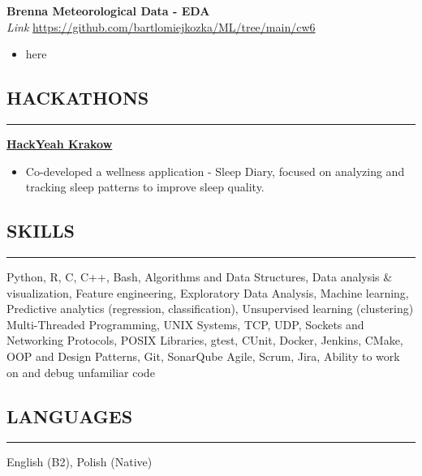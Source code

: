 \documentclass{article}
\begin{document}
\noindent\textbf{Brenna Meteorological Data - EDA} \\
\textit{Link}
\href{https://github.com/bartlomiejkozka/ML/tree/main/cw6}{https://github.com/bartlomiejkozka/ML/tree/main/cw6}
\begin{itemize}[itemsep=-3pt, topsep=3pt]
    \item here
\end{itemize}


\subsection*{HACKATHONS}
\vspace{-1.5em}
\rule{\textwidth}{0.1pt}
\vspace{-0.5em}

\noindent\textbf{\underline{HackYeah Krakow}}
\begin{itemize}[itemsep=-3pt, topsep=3pt]
    \item Co-developed a wellness application - Sleep Diary, focused on analyzing and tracking sleep patterns to improve sleep quality.
\end{itemize}


\subsection*{SKILLS}
\vspace{-1.5em}
\rule{\textwidth}{0.1pt}
Python, R, C, C++, Bash, Algorithms and Data Structures, 
Data analysis \& visualization, Feature engineering, Exploratory Data Analysis,
Machine learning, Predictive analytics (regression, classification), Unsupervised learning (clustering)
Multi-Threaded Programming, UNIX Systems, TCP, UDP, Sockets and Networking Protocols, POSIX Libraries, 
gtest, CUnit, Docker, Jenkins, CMake, OOP and Design Patterns, Git, SonarQube  
Agile, Scrum, Jira, Ability to work on and debug unfamiliar code


\subsection*{LANGUAGES}
\vspace{-1.5em}
\rule{\textwidth}{0.1pt}
English (B2), Polish (Native)
\end{document}
